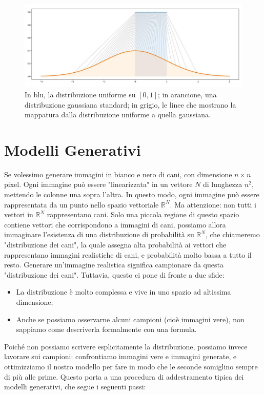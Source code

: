 \begin{figure}
    \centering
    \includegraphics[width=\textwidth]{figure/InvTrasf.png}
    \caption{In blu, la distribuzione uniforme su $[0,1]$; in arancione, una distribuzione gaussiana standard; in grigio, le linee che mostrano la mappatura dalla distribuzione uniforme a quella gaussiana.}
    \label{fig:invTrasf}
\end{figure}

\section{Modelli Generativi}

Se volessimo generare immagini in bianco e nero di cani, con dimensione $n \times n$ pixel. Ogni immagine può essere "linearizzata" in un vettore $N$ di lunghezza $n^2$, mettendo le colonne una sopra l’altra. In questo modo, ogni immagine può essere rappresentata da un punto nello spazio vettoriale $\mathbb{R}^N$. Ma attenzione: non tutti i vettori in $\mathbb{R}^N$ rappresentano cani. Solo una piccola regione di questo spazio contiene vettori che corrispondono a immagini di cani, possiamo allora immaginare l’esistenza di una distribuzione di probabilità su $\mathbb{R}^N$, che chiameremo "distribuzione dei cani", la quale assegna alta probabilità ai vettori che rappresentano immagini realistiche di cani, e probabilità molto bassa a tutto il resto. Generare un'immagine realistica significa campionare da questa "distribuzione dei cani". Tuttavia, questo ci pone di fronte a due sfide:
\begin{itemize}
    \item La distribuzione è molto complessa e vive in uno spazio ad altissima dimensione;
    \item Anche se possiamo osservarne alcuni campioni (cioè immagini vere), non sappiamo come descriverla formalmente con una formula.
\end{itemize}

Poiché non possiamo scrivere esplicitamente la distribuzione, possiamo invece lavorare sui campioni: confrontiamo immagini vere e immagini generate, e ottimizziamo il nostro modello per fare in modo che le seconde somiglino sempre di più alle prime. Questo porta a una procedura di addestramento tipica dei modelli generativi, che segue i seguenti passi:

